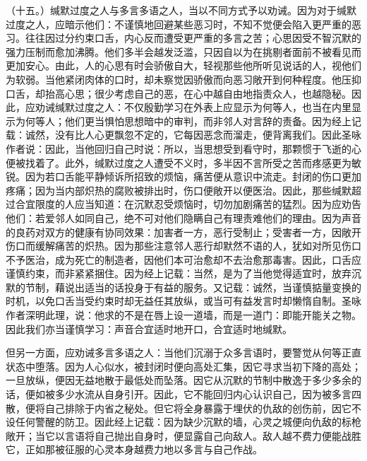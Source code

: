 \par

（十五。）缄默过度之人与多言多语之人，当以不同方式予以劝诫。因为对于缄默过度之人，应暗示他们：不谨慎地回避某些恶习时，不知不觉便会陷入更严重的恶习。往往因过分约束口舌，内心反而遭受更严重的多言之苦；心思因受不智沉默的强力压制而愈加沸腾。他们多半会越发泛滥，只因自以为在挑剔者面前不被看见而更加安心。由此，人的心思有时会骄傲自大，轻视那些他所听见说话的人，视他们为软弱。当他紧闭肉体的口时，却未察觉因骄傲而向恶习敞开到何种程度。他压抑口舌，却抬高心思；很少考虑自己的恶，在心中越自由地指责众人，也越隐秘。因此，应劝诫缄默过度之人：不仅殷勤学习在外表上应显示为何等人，也当在内里显示为何等人；他们更当惧怕思想暗中的审判，而非邻人对言辞的责备。因为经上记载：诚然，没有比人心更飘忽不定的，它每因恶念而溜走，便背离我们。因此圣咏作者说：因此，当他回归自己时说：所以，当思想受到看守时，那颗惯于飞逝的心便被找着了。此外，缄默过度之人遭受不义时，多半因不言所受之苦而疼感更为敏锐。因为若口舌能平静倾诉所招致的烦恼，痛苦便从意识中流走。封闭的伤口更加疼痛；因为当内部炽热的腐败被排出时，伤口便敞开以便医治。因此，那些缄默超过合宜限度的人应当知道：在沉默忍受烦恼时，切勿加剧痛苦的猛烈。因为应劝告他们：若爱邻人如同自己，绝不可对他们隐瞒自己有理责难他们的理由。因为声音的良药对双方的健康有协同效果：加害者一方，恶行受制止；受害者一方，因敞开伤口而缓解痛苦的炽热。因为那些注意邻人恶行却默然不语的人，犹如对所见伤口不予医治，成为死亡的制造者，因他们本可治愈却不去治愈那毒害。因此，口舌应谨慎约束，而非紧紧捆住。因为经上记载：当然，是为了当他觉得适宜时，放弃沉默的节制，藉说出适当的话投身于有益的服务。又记载：诚然，当谨慎掂量变换的时机，以免口舌当受约束时却无益任其放纵，或当可有益发言时却懒惰自制。圣咏作者深明此理，说：他求的不是在唇上设一道墙，而是一道门：即能开能关之物。因此我们亦当谨慎学习：声音合宜适时地开口，合宜适时地缄默。\par

但另一方面，应劝诫多言多语之人：当他们沉溺于众多言语时，要警觉从何等正直状态中堕落。因为人心似水，被封闭时便向高处汇集，因它寻求当初下降的高处；一旦放纵，便因无益地散于最低处而坠落。因它从沉默的节制中散逸于多少多余的话，便如被多少水流从自身引开。因此，它不能回归内心认识自己，因为被多言四散，便将自己排除于内省之秘处。但它将全身暴露于埋伏的仇敌的创伤前，因它不设任何警醒的防卫。因此经上记载：因为缺少沉默的墙，心灵之城便向仇敌的标枪敞开；当它以言语将自己抛出自身时，便显露自己向敌人。敌人越不费力便能战胜它，正如那被征服的心灵本身越费力地以多言与自己作战。\par

